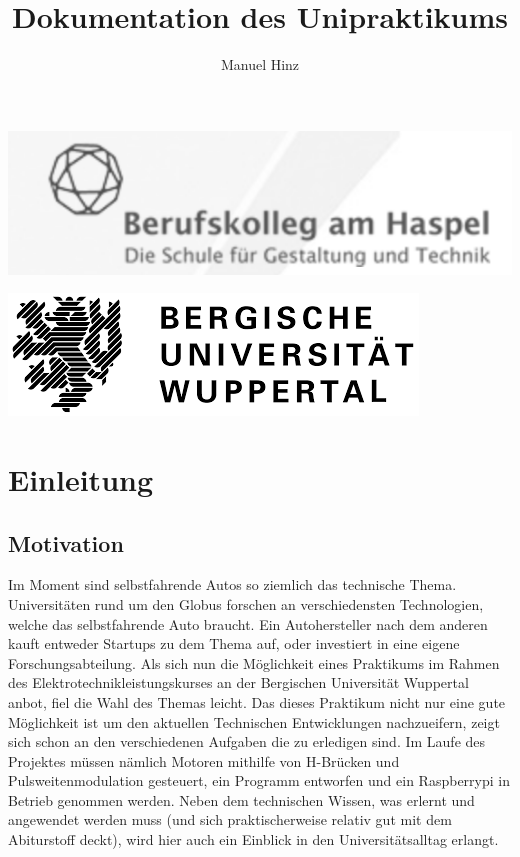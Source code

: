 \documentclass[notitlepage]{report}
\author{Manuel Hinz}
\title{Dokumentation des Unipraktikums}
\begin{document}
\maketitle
\includegraphics[scale=1]{BKAH.png}

\includegraphics[scale=0.75]{Uni.png}

\tableofcontents
\newpage

\chapter{Einleitung}

\section{Motivation}
Im Moment sind selbstfahrende Autos so ziemlich das technische Thema. Universit\"{a}ten rund um den Globus forschen an verschiedensten Technologien, welche das selbstfahrende Auto braucht. Ein Autohersteller nach dem anderen kauft entweder Startups zu dem Thema auf, oder investiert in eine eigene Forschungsabteilung. Als sich nun die M\"{o}glichkeit eines Praktikums im Rahmen des Elektrotechnikleistungskurses an der Bergischen Universit\"{a}t Wuppertal anbot, fiel die Wahl des Themas leicht. Das dieses Praktikum nicht nur eine gute M\"{o}glichkeit ist um den aktuellen Technischen Entwicklungen nachzueifern, zeigt sich schon an den verschiedenen Aufgaben die zu erledigen sind. Im Laufe des Projektes m\"{u}ssen n\"{a}mlich Motoren mithilfe von H-Br\"{u}cken und Pulsweitenmodulation gesteuert, ein Programm entworfen und ein Raspberrypi in Betrieb genommen werden. Neben dem technischen Wissen, was erlernt und angewendet werden muss (und sich praktischerweise relativ gut mit dem Abiturstoff deckt), wird hier auch ein Einblick in den Universit\"{a}tsalltag erlangt.  
\end{document}
